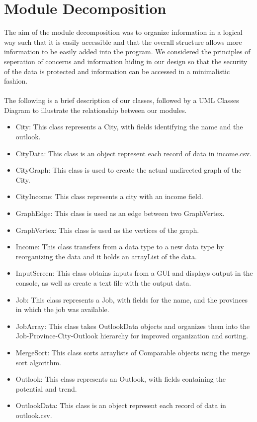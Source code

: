 \documentclass[12pt,fleqn]{article}
\begin{document}
\section*{Module Decomposition}
The aim of the module decomposition was to organize information in a logical way such that it is easily accessible and that the overall structure allows more information to be easily added into the program. We considered the principles of seperation of concerns and information hiding in our design so that the security of the data is protected and information can be accessed in a minimalistic fashion.
\\\\
The following is a brief description of our classes, followed by a UML Classes Diagram to illustrate the relationship between our modules.
\begin{itemize}
\item City: This class represents a City, with fields identifying the name and the outlook.
\item CityData: This class is an object represent each record of data in income.csv.
\item CityGraph: This class is used to create the actual undirected graph of the City.
\item CityIncome: This class represents a city with an income field.
\item GraphEdge: This class is used as an edge between two GraphVertex.
\item GraphVertex: This class is used as the vertices of the graph.
\item Income: This class transfers from a data type to a new data type by reorganizing the data and it holds an arrayList of the data. 
\item InputScreen: This class obtains inputs from a GUI and displays output in the console, as well as create a text file with the output data.
\item Job: This class represents a Job, with fields for the name, and the provinces in which the job was available.
\item JobArray: This class takes OutlookData objects and organizes them into the Job-Province-City-Outlook hierarchy for improved organization and sorting.
\item MergeSort: This class sorts arraylists of Comparable objects using the merge sort algorithm.
\item Outlook: This class represents an Outlook, with fields containing the potential and trend.
\item OutlookData: This class is an object represent each record of data in outlook.csv.

\end{itemize}
\end{document}

